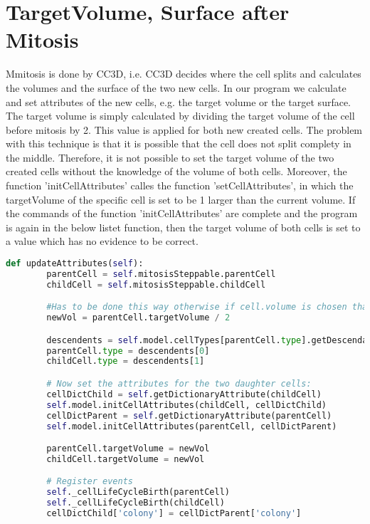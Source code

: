 \section{TargetVolume, Surface after Mitosis}
Mmitosis is done by \ac{CC3D}, i.e. \ac{CC3D} decides where the cell splits and calculates the volumes and the surface of the two new cells. In our program we calculate and set attributes of the new cells, e.g. the target volume or the target surface. The target volume is simply calculated by dividing the target volume of the cell before mitosis by 2. This value is applied for both new created cells. The problem with this technique is that it is possible that the cell does not split complety in the middle. Therefore, it is not possible to set the target volume of the two created cells without the knowledge of the volume of both cells. Moreover, the function 'initCellAttributes' calles the function 'setCellAttributes', in which the targetVolume of the specific cell is set to be 1 larger than the current volume. If the commands of the function 'initCellAttributes' are complete and the program is again in the below listet function, then the target volume of both cells is set to a value which has no evidence to be correct.
\begin{lstlisting}[language=Python, caption=two cells are created by mitosis where the target volume is set at a wrong place]
    def updateAttributes(self):
        parentCell = self.mitosisSteppable.parentCell
        childCell = self.mitosisSteppable.childCell

        #Has to be done this way otherwise if cell.volume is chosen than it disappears
        newVol = parentCell.targetVolume / 2

        descendents = self.model.cellTypes[parentCell.type].getDescendants()
        parentCell.type = descendents[0]
        childCell.type = descendents[1]

        # Now set the attributes for the two daughter cells:
        cellDictChild = self.getDictionaryAttribute(childCell)
        self.model.initCellAttributes(childCell, cellDictChild)
        cellDictParent = self.getDictionaryAttribute(parentCell)
        self.model.initCellAttributes(parentCell, cellDictParent)

        parentCell.targetVolume = newVol
        childCell.targetVolume = newVol

        # Register events
        self._cellLifeCycleBirth(parentCell)
        self._cellLifeCycleBirth(childCell)
		cellDictChild['colony'] = cellDictParent['colony']
\end{lstlisting}\label{lst:TargetVolumeWrongPlace}
